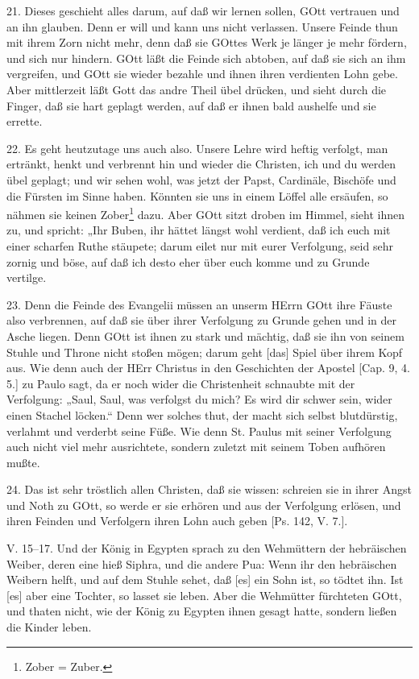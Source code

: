 21. Dieses geschieht alles darum, auf daß wir lernen sollen, GOtt vertrauen und an ihn glauben. Denn er will und kann uns nicht verlassen. Unsere Feinde thun mit ihrem Zorn nicht mehr, denn daß sie GOttes Werk je länger je mehr fördern, und sich nur hindern. GOtt läßt die Feinde sich abtoben, auf daß sie sich an ihm vergreifen, und GOtt sie wieder bezahle und ihnen ihren verdienten Lohn gebe. Aber mittlerzeit läßt Gott das andre Theil übel drücken, und sieht durch die Finger, daß sie hart geplagt werden, auf daß er ihnen bald aushelfe und sie errette.

22. Es geht heutzutage uns auch also. Unsere Lehre wird heftig verfolgt, man ertränkt, henkt und verbrennt hin und wieder die Christen, ich und du werden übel geplagt; und wir sehen wohl, was jetzt der Papst, Cardinäle, Bischöfe und die Fürsten im Sinne haben. Könnten sie uns in einem Löffel alle ersäufen, so nähmen sie keinen Zober\footnote{Zober = Zuber.} dazu. Aber GOtt sitzt droben im Himmel, sieht ihnen zu, und spricht: „Ihr Buben, ihr hättet längst wohl verdient, daß ich euch mit einer scharfen Ruthe stäupete; darum eilet nur mit eurer Verfolgung, seid sehr zornig und böse, auf daß ich desto eher über euch komme und zu Grunde vertilge.

23. Denn die Feinde des Evangelii müssen an unserm HErrn GOtt ihre Fäuste also verbrennen, auf daß sie über ihrer Verfolgung zu Grunde gehen und in der Asche liegen. Denn GOtt ist ihnen zu stark und mächtig, daß sie ihn von seinem Stuhle und Throne nicht stoßen mögen; darum geht [das] Spiel über ihrem Kopf aus. Wie denn auch der HErr Christus in den Geschichten der Apostel [Cap. 9, 4. 5.] zu Paulo sagt, da er noch wider die Christenheit schnaubte mit der Verfolgung: „Saul, Saul, was verfolgst du mich? Es wird dir schwer sein, wider einen Stachel löcken.“ Denn
wer solches thut, der macht sich selbst blutdürstig, verlahmt und verderbt seine Füße. Wie denn St. Paulus mit seiner Verfolgung auch nicht viel mehr ausrichtete, sondern zuletzt mit seinem Toben aufhören mußte.

24. Das ist sehr tröstlich allen Christen, daß sie wissen: schreien sie in ihrer Angst und Noth zu GOtt, so werde er sie erhören und aus der Verfolgung erlösen, und ihren Feinden und Verfolgern ihren Lohn auch geben [Ps. 142, V. 7.].

\begin{schriftzitat}
V. 15–17. Und der König in Egypten sprach zu den Wehmüttern der hebräischen Weiber, deren eine hieß Siphra, und die andere Pua: Wenn ihr den hebräischen Weibern helft, und auf dem Stuhle sehet, daß [es] ein Sohn ist, so tödtet ihn. Ist [es] aber eine Tochter, so lasset sie leben. Aber die Wehmütter fürchteten GOtt, und thaten nicht, wie der König zu Egypten ihnen gesagt hatte, sondern ließen die Kinder leben.
\end{schriftzitat}


